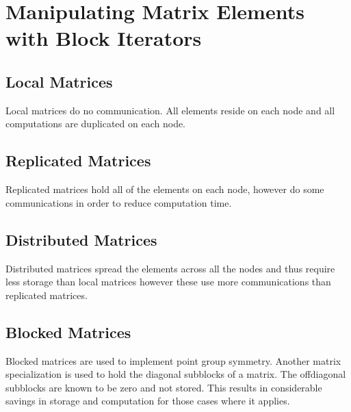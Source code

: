 \section{Manipulating Matrix Elements with Block Iterators}



\subsection{Local Matrices}

Local matrices do no communication.  All elements reside on each node
and all computations are duplicated on each node.

\subsection{Replicated Matrices}

Replicated matrices hold all of the elements on each node, however
do some communications in order to reduce computation time.

\subsection{Distributed Matrices}

Distributed matrices spread the elements across all the nodes and
thus require less storage than local matrices however these use
more communications than replicated matrices.

\subsection{Blocked Matrices}

Blocked matrices are used to implement point group symmetry.  Another
matrix specialization is used to hold the diagonal subblocks of a
matrix.  The offdiagonal subblocks are known to be zero and not stored.
This results in considerable savings in storage and computation for
those cases where it applies.
